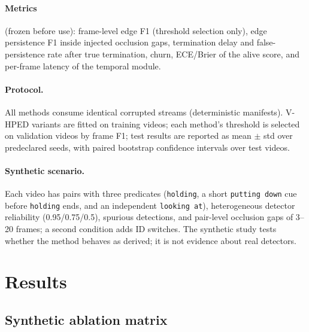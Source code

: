 \documentclass[10pt]{article}
\begin{document}
\paragraph{Metrics} (frozen before use): frame-level edge F1 (threshold
selection only), edge persistence F1 inside injected occlusion gaps,
termination delay and false-persistence rate after true termination, churn,
ECE/Brier of the alive score, and per-frame latency of the temporal module.
\paragraph{Protocol.} All methods consume identical corrupted streams
(deterministic manifests). V-HPED variants are fitted on training videos;
each method's threshold is selected on validation videos by frame F1;
test results are reported as mean $\pm$ std over \synSeeds{} predeclared
seeds, with paired bootstrap confidence intervals over test videos.
\paragraph{Synthetic scenario.} Each video has pairs with three predicates
(\texttt{holding}, a short \texttt{putting down} cue before
\texttt{holding} ends, and an independent \texttt{looking at}), heterogeneous
detector reliability (0.95/0.75/0.5), spurious detections, and pair-level
occlusion gaps of 3--20 frames; a second condition adds ID switches.
The synthetic study tests whether the method behaves as derived; it is not
evidence about real detectors.

\section{Results}
\subsection{Synthetic ablation matrix}


\begin{table}[t]
\centering\scriptsize
\caption{Synthetic, occlusion + detector flicker. Test mean $\pm$ std over
seeds at the validation-selected threshold (run \synRunId).}
\label{tab:abl}
\resizebox{\linewidth}{!}{}
\end{table}

\begin{table}[t]
\centering\scriptsize
\caption{Synthetic, occlusion + flicker + ID switches.}
\label{tab:ablid}
\resizebox{\linewidth}{!}{}
\end{table}
\end{document}
